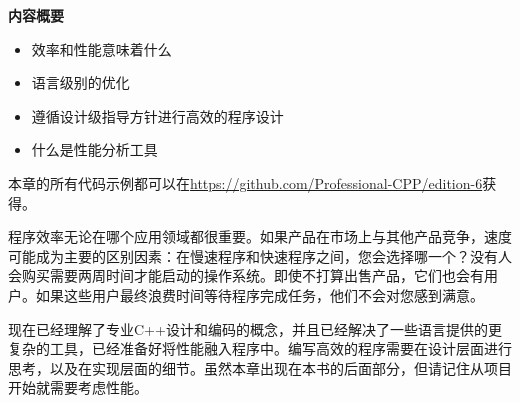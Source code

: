 \noindent
\textbf{内容概要}

\begin{itemize}
\item
效率和性能意味着什么

\item
语言级别的优化

\item
遵循设计级指导方针进行高效的程序设计

\item
什么是性能分析工具
\end{itemize}

本章的所有代码示例都可以在\url{https://github.com/Professional-CPP/edition-6}获得。

程序效率无论在哪个应用领域都很重要。如果产品在市场上与其他产品竞争，速度可能成为主要的区别因素：在慢速程序和快速程序之间，您会选择哪一个？没有人会购买需要两周时间才能启动的操作系统。即使不打算出售产品，它们也会有用户。如果这些用户最终浪费时间等待程序完成任务，他们不会对您感到满意。

现在已经理解了专业C++设计和编码的概念，并且已经解决了一些语言提供的更复杂的工具，已经准备好将性能融入程序中。编写高效的程序需要在设计层面进行思考，以及在实现层面的细节。虽然本章出现在本书的后面部分，但请记住从项目开始就需要考虑性能。















